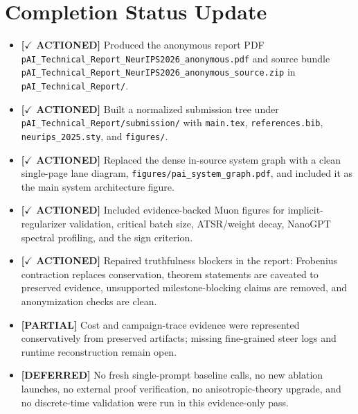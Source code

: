 \documentclass[11pt]{article}
\newcommand{\actioned}{\textbf{\textcolor{green!45!black}{[$\checkmark$ ACTIONED]}}}
\newcommand{\partialdone}{\textbf{\textcolor{orange!75!black}{[PARTIAL]}}}
\newcommand{\deferred}{\textbf{\textcolor{blue!65!black}{[DEFERRED]}}}
\begin{document}
\section*{Completion Status Update}
\begin{itemize}
  \item \actioned{} Produced the anonymous report PDF \texttt{pAI\_Technical\_Report\_NeurIPS2026\_anonymous.pdf} and source bundle \texttt{pAI\_Technical\_Report\_NeurIPS2026\_anonymous\_source.zip} in \texttt{pAI\_Technical\_Report/}.
  \item \actioned{} Built a normalized submission tree under \texttt{pAI\_Technical\_Report/submission/} with \texttt{main.tex}, \texttt{references.bib}, \texttt{neurips\_2025.sty}, and \texttt{figures/}.
  \item \actioned{} Replaced the dense in-source system graph with a clean single-page lane diagram, \texttt{figures/pai\_system\_graph.pdf}, and included it as the main system architecture figure.
  \item \actioned{} Included evidence-backed Muon figures for implicit-regularizer validation, critical batch size, ATSR/weight decay, NanoGPT spectral profiling, and the sign criterion.
  \item \actioned{} Repaired truthfulness blockers in the report: Frobenius contraction replaces conservation, theorem statements are caveated to preserved evidence, unsupported milestone-blocking claims are removed, and anonymization checks are clean.
  \item \partialdone{} Cost and campaign-trace evidence were represented conservatively from preserved artifacts; missing fine-grained steer logs and runtime reconstruction remain open.
  \item \deferred{} No fresh single-prompt baseline calls, no new ablation launches, no external proof verification, no anisotropic-theory upgrade, and no discrete-time validation were run in this evidence-only pass.
\end{itemize}
\end{document}
